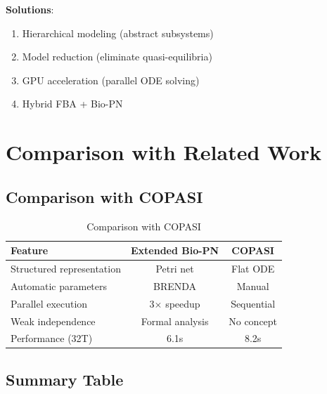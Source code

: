 \textbf{Solutions}:
\begin{enumerate}
    \item Hierarchical modeling (abstract subsystems)
    \item Model reduction (eliminate quasi-equilibria)
    \item GPU acceleration (parallel ODE solving)
    \item Hybrid FBA + Bio-PN
\end{enumerate}

\section{Comparison with Related Work}
\label{sec:related-comparison}

\subsection{Comparison with COPASI}
\label{subsec:vs-copasi}

\begin{table}[h]
\centering
\begin{tabular}{@{}lcc@{}}
\toprule
\textbf{Feature} & \textbf{Extended Bio-PN} & \textbf{COPASI} \\
\midrule
Structured representation & Petri net & Flat ODE \\
Automatic parameters & BRENDA & Manual \\
Parallel execution & 3$\times$ speedup & Sequential \\
Weak independence & Formal analysis & No concept \\
Performance (32T) & 6.1s & 8.2s \\
\bottomrule
\end{tabular}
\caption{Comparison with COPASI}
\label{tab:vs-copasi}
\end{table}

\subsection{Summary Table}
\label{subsec:summary-table}


